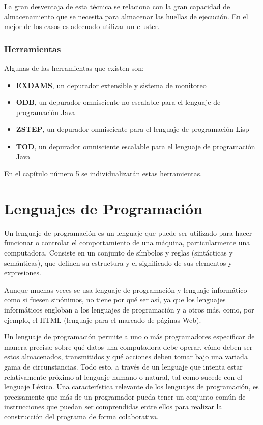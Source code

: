\documentclass[12pt,legalpaper]{report}
\begin{document}
La gran desventaja de esta técnica se relaciona con la gran capacidad de almacenamiento que se necesita para almacenar las huellas de ejecución.  En el mejor de los casos es adecuado utilizar un cluster.

			\subsubsection{Herramientas}

Algunas de las herramientas que existen son:
\begin{itemize}
	\item \textbf{EXDAMS}, un depurador extensible y sistema de monitoreo
	\item \textbf{ODB}, un depurador omnisciente no escalable para el lenguaje de programación Java 
	\item \textbf{ZSTEP}, un depurador omnisciente para el lenguaje de programación Lisp
	\item \textbf{TOD}, un depurador omnisciente escalable para el lenguaje de programación Java
\end{itemize}

En el capítulo número 5 se individualizarán estas herramientas.

	\section{Lenguajes de Programación}

Un lenguaje de programación es un lenguaje que puede ser utilizado para hacer funcionar o controlar el comportamiento de una máquina, particularmente una computadora. Consiste en un conjunto de símbolos y reglas (sintácticas y semánticas), que definen su estructura y el significado de sus elementos y expresiones.

Aunque muchas veces se usa lenguaje de programación y lenguaje informático como si fuesen sinónimos, no tiene por qué ser así, ya que los lenguajes informáticos engloban a los lenguajes de programación y a otros más, como, por ejemplo, el HTML (lenguaje para el marcado de páginas Web).

Un lenguaje de programación permite a uno o más programadores especificar de manera precisa: sobre qué datos una computadora debe operar, cómo deben ser estos almacenados, transmitidos y qué acciones deben tomar bajo una variada gama de circunstancias. Todo esto, a través de un lenguaje que intenta estar relativamente próximo al lenguaje humano o natural, tal como sucede con el lenguaje Léxico. Una característica relevante de los lenguajes de programación, es precisamente que más de un programador pueda tener un conjunto común de instrucciones que puedan ser comprendidas entre ellos para realizar la construcción del programa de forma colaborativa.
\end{document}
